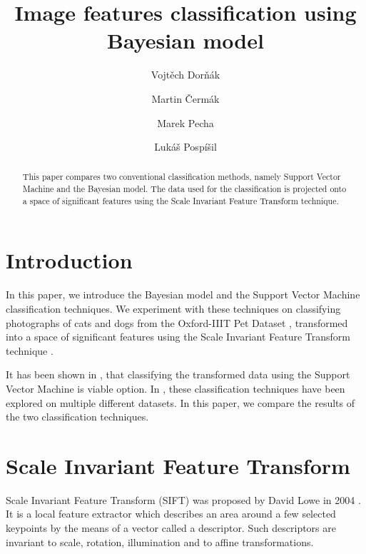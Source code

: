 \documentclass{aip-cp}
\begin{document}
\title{Image features classification using Bayesian model}

\author[aff1,aff2]{Vojt\v{e}ch Dor\v{n}\'{a}k}
\author[aff1,aff2]{Martin \v{C}erm\'{a}k}
\author[aff2]{Marek Pecha}
\author[aff1]{Luk\'{a}\v{s} Posp\'{i}\v{s}il}


\maketitle

\begin{abstract}
    This paper compares two conventional classification methods, namely Support Vector Machine and the Bayesian model. The data used for the classification is projected onto a space of significant features using the Scale Invariant Feature Transform technique.
\end{abstract}

\maketitle

\section{Introduction}
In this paper, we introduce the Bayesian model and the Support Vector Machine classification techniques. We experiment with these techniques on classifying photographs of cats and dogs from the Oxford-IIIT Pet Dataset \cite{parkhi12a}, transformed into a space of significant features using the Scale Invariant Feature Transform technique \cite{Lowe2004}.

It has been shown in \cite{dornak2020}, that classifying the transformed data using the Support Vector Machine is viable option. In \cite{dornak2021}, these classification techniques have been explored on multiple different datasets. In this paper, we compare the results of the two classification techniques.

\section{Scale Invariant Feature Transform}
Scale Invariant Feature Transform (SIFT) was proposed by David Lowe in 2004 \cite{Lowe2004}. It is a local feature extractor which describes an area around a few selected keypoints by the means of a vector called a descriptor. Such descriptors are invariant to scale, rotation, illumination and to affine transformations.
\end{document}
